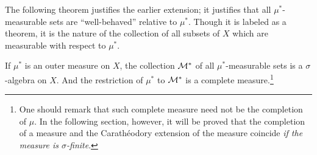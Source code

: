 The following theorem justifies the earlier extension; it justifies that all $\mu^*$-measurable sets are ``well-behaved'' relative to $\mu^*$.
Though it is labeled as a theorem, it is the nature of the collection of all subsets of $X$ which are measurable with respect to $\mu^*$.
\begin{thm}
    If $\mu^*$ is an outer measure on $X$, the collection ${\mathcal{M}}^*$ of all $\mu^*$-measurable sets is a $\sigma$-algebra on $X$.
    And the restriction of $\mu^*$ to ${\mathcal{M}}^*$ is a complete measure.\footnote{One should remark that such complete measure need not be the completion of $\mu$. In the following section, however, it will be proved that the completion of a measure and the Carath\'{e}odory extension of the measure coincide \textit{if the measure is $\sigma$-finite}.}
\end{thm}
